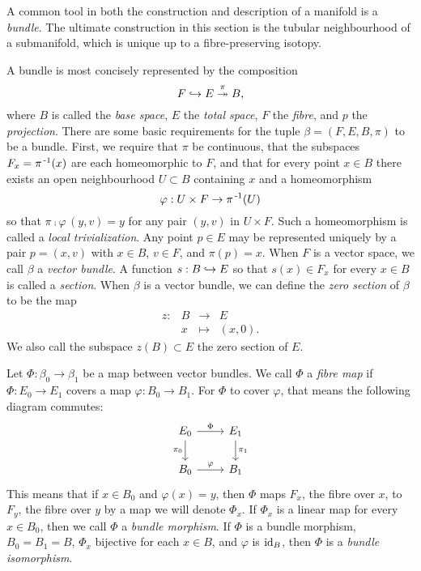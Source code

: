 A common tool in both the construction and description of a manifold is a \emph{bundle}.
The ultimate construction in this section is the tubular neighbourhood of a submanifold, which is unique up to a fibre-preserving isotopy.

\begin{defn}[Bundles]
	A bundle is most concisely represented by the composition
	\[
		F\hookrightarrow E\overset{\pi}{\twoheadrightarrow} B,
	\]
	where $B$ is called the \emph{base space}, $E$ the \emph{total space}, $F$ the \emph{fibre}, and $p$ the \emph{projection}.
	There are some basic requirements for the tuple $\beta = (F,E,B,\pi)$ to be a bundle.
	First, we require that $\pi$ be continuous, that the subspaces $F_x = \pi^{\,\text{-}1}(x)$ are each homeomorphic to $F$, and that for every point $x\in B$ there exists an open neighbourhood $U\subset B$ containing $x$ and a homeomorphism
	\[
		\varphi: U\times F\to \pi^{\,\text{-}1}(U)
	\]
	so that $\pi\comp\varphi\,(y,v)=y$ for any pair $(y,v)$ in $U\times F$.
	Such a homeomorphism is called a \emph{local trivialization}.
	Any point $p\in E$ may be represented uniquely by a pair $p=(x,v)$ with $x\in B$, $v\in F$, and $\pi(p)=x$.
	When $F$ is a vector space, we call $\beta$ a \emph{vector bundle}.
	A function $s:B\hookrightarrow E$ so that $s(x)\in F_x$ for every $x\in B$ is called a \emph{section}.
	When $\beta$ is a vector bundle, we can define the \emph{zero section} of $\beta$ to be the map
	\[
		\begin{array}{cccc}
			z: & B & \to 	 & E \\
			   & x & \mapsto & (x,0).
		\end{array}
	\]
	We also call the subspace $z(B)\subset E$ the zero section of $E$.
\end{defn}

\begin{defn}
	Let $\Phi:\beta_0\to \beta_1$ be a map between vector bundles.
	We call $\Phi$ a \emph{fibre map} if $\Phi:E_0\to E_1$ covers a map $\varphi:B_0\to B_1$.
	For $\Phi$ to cover $\varphi$, that means the following diagram commutes:
	\[
		\begin{tikzcd}
			E_0 \arrow{r}{\Phi} \arrow[swap]{d}{\pi_0} & E_1 \arrow{d}{\pi_1} \\
			B_0 \arrow{r}{\varphi} & B_1
		\end{tikzcd}
	\]
	This means that if $x\in B_0$ and $\varphi(x)=y$, then $\Phi$ maps $F_x$, the fibre over $x$, to $F_y$, the fibre over $y$ by a map we will denote $\Phi_x$.
	If $\Phi_x$ is a linear map for every $x\in B_0$, then we call $\Phi$ a \emph{bundle morphism}.
	If $\Phi$ is a bundle morphism, $B_0=B_1=B$, $\Phi_x$ bijective for each $x\in B$, and $\varphi$ is $\textrm{id}_{B}$, then $\Phi$ is a \emph{bundle isomorphism}.
\end{defn}


